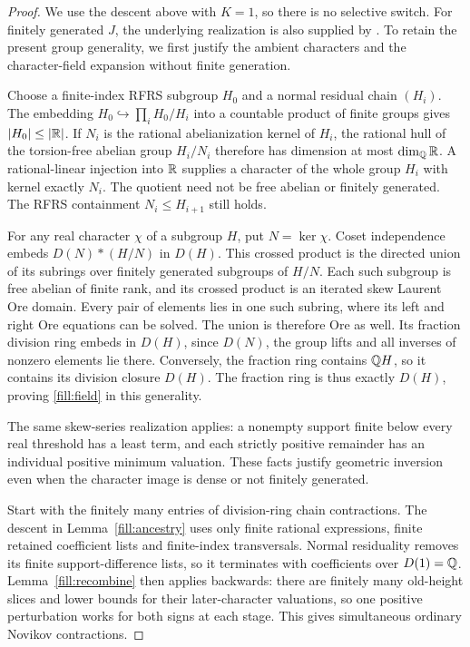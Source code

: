 \begin{proof}
We use the descent above with \(K=1\), so there is no selective
switch. For finitely generated \(J\), the underlying realization is
also supplied by \cite[Theorem~5.2]{Kielak2020}. To retain the present
group generality, we first justify the ambient characters and the
character-field expansion without finite generation.

Choose a finite-index RFRS subgroup \(H_0\) and a normal residual
chain \((H_i)\). The embedding
\(H_0\hookrightarrow\prod_i H_0/H_i\) into a countable product of
finite groups gives \(|H_0|\leq|\mathbb R|\). If \(N_i\) is the rational
abelianization kernel of \(H_i\), the rational hull of the torsion-free
abelian group \(H_i/N_i\) therefore has dimension at most
\(\dim_{\mathbb Q}\mathbb R\). A rational-linear injection into \(\mathbb R\) supplies
a character of the whole group \(H_i\) with kernel exactly \(N_i\).
The quotient need not be free abelian or finitely generated. The
RFRS containment \(N_i\leq H_{i+1}\) still holds.

For any real character \(\chi\) of a subgroup \(H\), put
\(N=\ker\chi\). Coset independence embeds
\(D(N)*(H/N)\) in \(D(H)\). This crossed product is the directed
union of its subrings over finitely generated subgroups of \(H/N\).
Each such subgroup is free abelian of finite rank, and its crossed
product is an iterated skew Laurent Ore domain. Every pair of
elements lies in one such subring, where its left and right Ore
equations can be solved. The union is therefore Ore as well.
Its fraction division ring embeds in \(D(H)\), since \(D(N)\), the
group lifts and all inverses of nonzero elements lie there. Conversely,
the fraction ring contains \(\mathbb Q H\), so it contains its division
closure \(D(H)\). The fraction ring is thus exactly \(D(H)\),
proving \eqref{fill:field} in this generality.

The same skew-series realization applies: a nonempty support finite
below every real threshold has a least term, and each strictly positive
remainder has an individual positive minimum valuation. These facts
justify geometric inversion even when the character image is dense
or not finitely generated.

Start with the finitely many entries of division-ring chain
contractions. The descent in Lemma~\ref{fill:ancestry} uses only finite
rational expressions, finite retained coefficient lists and finite-index
transversals. Normal residuality removes its finite support-difference
lists, so it terminates with coefficients over \(D(1)=\mathbb Q\).
Lemma~\ref{fill:recombine} then applies backwards: there are finitely
many old-height slices and lower bounds for their later-character
valuations, so one positive perturbation works for both signs at each
stage. This gives simultaneous ordinary Novikov contractions.


\end{proof}
